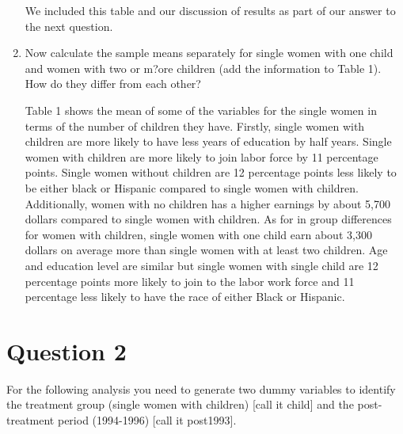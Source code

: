\documentclass{article}
\begin{document}
\begin{enumerate}[label=\alph*]
We included this table and our discussion of results as part of our answer to the next question.


\item  Now calculate the sample means separately for single women with one child and women with two or m?ore children (add the information to Table 1). How do they differ from each other?

Table 1 shows the mean of some of the variables for the single women in terms of the number of children they have. Firstly, single women with children are more likely to have less years of education by half years. Single women with children are more likely to join labor force by 11 percentage points. Single women without children are 12 percentage points less likely to be either black or Hispanic compared to single women with children. Additionally, women with no children has a higher earnings by about 5,700 dollars compared to single women with children. As for in group differences for women with children,  single women with one child earn about 3,300 dollars on average more than single women with at least two children. Age and education level are similar but single women with single child are 12 percentage points more likely to join to the labor work force and 11 percentage less likely to have the race of either Black or Hispanic.



\end{enumerate}

\section{Question 2}

For the following analysis you need to generate two dummy variables to identify the treatment group (single women with children) [call it child] and the post-treatment period (1994-1996) [call it post1993].
\end{document}
